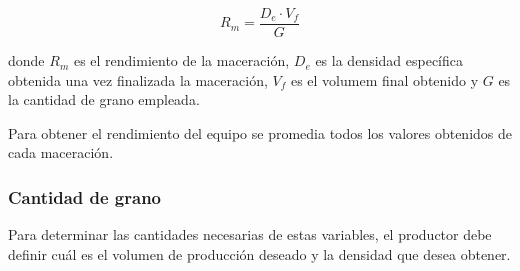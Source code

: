                \begin{equation}
                    R_m = \frac{D_e \cdot V_f}{G}
                \end{equation}
                
                \par donde $R_m$ es el rendimiento de la maceración, $D_e$ es la densidad específica obtenida una vez finalizada la maceración, $V_f$ es el volumem final obtenido y $G$ es la cantidad de grano empleada.
                
                \par Para obtener el rendimiento del equipo se promedia todos los valores obtenidos de cada maceración.
    
            
            \subsubsection{Cantidad de grano}
                \par Para determinar las cantidades necesarias de estas variables, el productor debe definir cuál es el volumen de producción deseado y la densidad que desea obtener.
                
